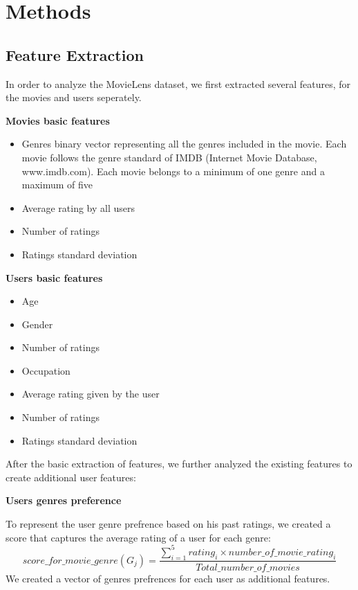 \section{Methods}
\label{sec:methods}


\subsection{Feature Extraction}
In order to analyze the MovieLens dataset, we first extracted several features, for the movies and users seperately. 

\textbf{Movies basic features} 
\begin{itemize}
\item Genres binary vector representing all the genres included in the movie. Each movie follows the genre standard of IMDB (Internet Movie Database, www.imdb.com). Each movie belongs to a minimum of one genre and a maximum of five
\item Average rating by all users
\item Number of ratings
\item Ratings standard deviation
\end{itemize}

\textbf{Users basic features} 
\begin{itemize}
\item Age
\item Gender
\item Number of ratings
\item Occupation
\item Average rating given by the user
\item Number of ratings
\item Ratings standard deviation
\end{itemize}

After the basic extraction of features, we further analyzed the existing features to create additional user features:

\textbf{Users genres preference}

To represent the user genre prefrence based on his past ratings, we created a score that captures the average rating of a user for each genre: 
\begin{equation} score\_for\_movie\_genre(G_j) = \frac{\sum^5_{i=1}{rating_i\times number\_of\_movie\_rating_i}}{Total\_number\_of\_movies} 
\end{equation}
We created a vector of genres prefrences for each user as additional features.

